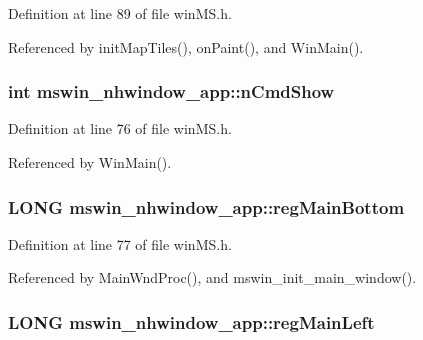Definition at line 89 of file win\+M\+S.\+h.



Referenced by init\+Map\+Tiles(), on\+Paint(), and Win\+Main().

\hypertarget{structmswin__nhwindow__app_a824b12aab95b45962e0385edd96efb2e}{
\subsubsection[{n\+Cmd\+Show}]{\setlength{\rightskip}{0pt plus 5cm}int mswin\+\_\+nhwindow\+\_\+app\+::n\+Cmd\+Show}}\label{structmswin__nhwindow__app_a824b12aab95b45962e0385edd96efb2e}


Definition at line 76 of file win\+M\+S.\+h.



Referenced by Win\+Main().

\hypertarget{structmswin__nhwindow__app_aeb2d03a559d6186f46fea9f56def55d1}{
\subsubsection[{reg\+Main\+Bottom}]{\setlength{\rightskip}{0pt plus 5cm}L\+O\+N\+G mswin\+\_\+nhwindow\+\_\+app\+::reg\+Main\+Bottom}}\label{structmswin__nhwindow__app_aeb2d03a559d6186f46fea9f56def55d1}


Definition at line 77 of file win\+M\+S.\+h.



Referenced by Main\+Wnd\+Proc(), and mswin\+\_\+init\+\_\+main\+\_\+window().

\hypertarget{structmswin__nhwindow__app_a4ed5841c55538304dde5389e7652631a}{
\subsubsection[{reg\+Main\+Left}]{\setlength{\rightskip}{0pt plus 5cm}L\+O\+N\+G mswin\+\_\+nhwindow\+\_\+app\+::reg\+Main\+Left}}\label{structmswin__nhwindow__app_a4ed5841c55538304dde5389e7652631a}


